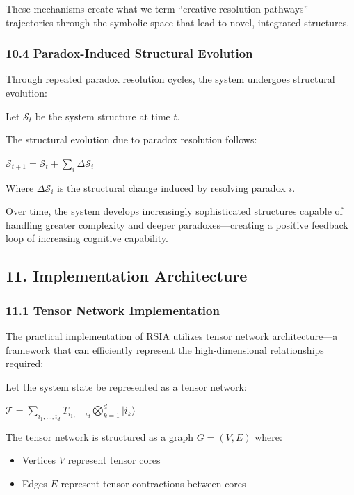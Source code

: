 \documentclass[12pt]{article}
\providecommand{\tightlist}{%
  \setlength{\itemsep}{0pt}\setlength{\parskip}{0pt}}
\begin{document}
These mechanisms create what we term ``creative resolution
pathways''---trajectories through the symbolic space that lead to novel,
integrated structures.

\subsubsection{10.4 Paradox-Induced Structural
Evolution}\label{paradox-induced-structural-evolution}

Through repeated paradox resolution cycles, the system undergoes
structural evolution:

Let \(\mathcal{S}_t\) be the system structure at time \(t\).

The structural evolution due to paradox resolution follows:

\(\mathcal{S}_{t+1} = \mathcal{S}_t + \sum_i \Delta \mathcal{S}_i\)

Where \(\Delta \mathcal{S}_i\) is the structural change induced by
resolving paradox \(i\).

Over time, the system develops increasingly sophisticated structures
capable of handling greater complexity and deeper paradoxes---creating a
positive feedback loop of increasing cognitive capability.

\subsection{11. Implementation
Architecture}\label{implementation-architecture}

\subsubsection{11.1 Tensor Network
Implementation}\label{tensor-network-implementation-1}

The practical implementation of RSIA utilizes tensor network
architecture---a framework that can efficiently represent the
high-dimensional relationships required:

Let the system state be represented as a tensor network:

\(\mathcal{T} = \sum_{i_1,...,i_d} T_{i_1,...,i_d} \bigotimes_{k=1}^d |i_k\rangle\)

The tensor network is structured as a graph \(G = (V, E)\) where:

\begin{itemize}
\tightlist
\item
  Vertices \(V\) represent tensor cores
\item
  Edges \(E\) represent tensor contractions between cores
\end{itemize}
\end{document}
